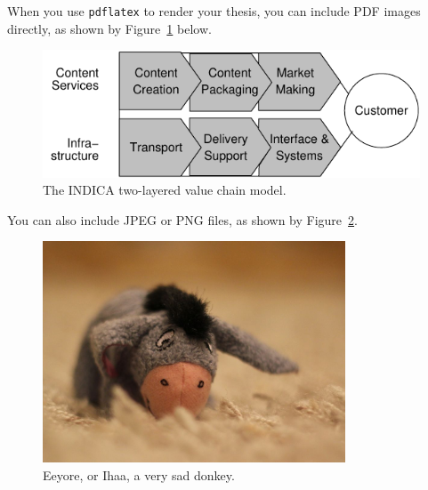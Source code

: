 When you use \texttt{pdflatex} to render your thesis, you can include PDF images
directly, as shown by Figure~\ref{fig:indica_model} below.

\begin{figure}[ht]
  \begin{center}
    \includegraphics[width=\textwidth]{images/indica_model.pdf}
    \caption{The INDICA two-layered value chain model.}
    \label{fig:indica_model}
  \end{center}
\end{figure}

You can also include JPEG or PNG files, as shown by Figure~\ref{fig:eeyore}.

\begin{figure}[ht]
  \begin{center}
    \includegraphics[width=9cm]{images/ihaa.jpg}
    \caption{Eeyore, or Ihaa, a very sad donkey.}
    \label{fig:eeyore}
  \end{center}
\end{figure}


